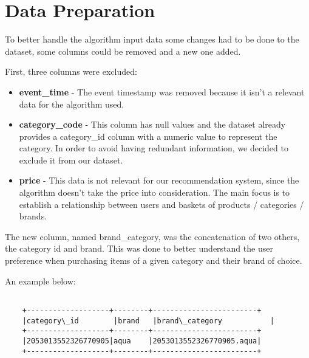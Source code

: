 \section{Data Preparation}
\label{data_prep}

To better handle the algorithm input data some changes had to be done to the dataset,
some columns could be removed and a new one added.

First, three columns were excluded:
\begin{itemize}
    \item \textbf{event\_time} - The event timestamp was removed because it isn't a relevant data for the algorithm used.
    \item \textbf{category\_code} - This column has null values and the dataset already provides a category\_id column with a numeric value to represent the category.
    In order to avoid having redundant information, we decided to exclude it from our dataset.
    \item \textbf{price} - This data is not relevant for our recommendation system, since the algorithm doesn't take the price into consideration.
    The main focus is to establish a relationship between users and baskets of products / categories / brands.
\end{itemize}

The new column, named brand\_category, was the concatenation of two others, the category id and brand. This was done to better 
understand the user preference when purchasing items of a given category and their brand of choice.

An example below:
\newline
\begin{center}
\begin{Verbatim}[commandchars=\\\{\}]
    
    +-------------------+--------+------------------------+
    |category\_id        |brand   |brand\_category           |
    +-------------------+--------+------------------------+
    |2053013552326770905|aqua    |2053013552326770905.aqua|
    +-------------------+--------+------------------------+
\end{Verbatim}
\end{center}

